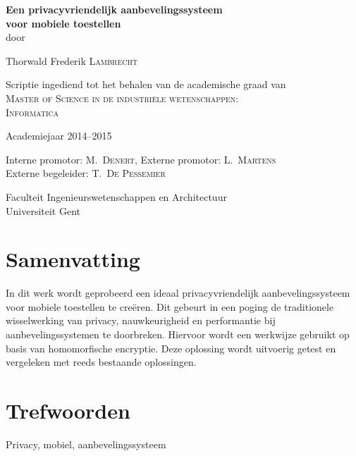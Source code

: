 
\newpage
{}
{
\setlength{\baselineskip}{12pt}
\setlength{\parindent}{0pt}
\setlength{\parskip}{6pt}

\begin{center}

\renewcommand{\baselinestretch}{1.1}
\noindent \huge \textbf{
Een privacyvriendelijk aanbevelingssysteem \\
voor mobiele toestellen 
} \\
\renewcommand{\baselinestretch}{1.3}
\normalsize
\vspace{3mm}
door 

Thorwald Frederik \textsc{Lambrecht}

Scriptie ingediend tot het behalen van de academische graad van\\
\textsc{Master of Science in de industri\"ele wetenschappen: \\Informatica}

Academiejaar 2014--2015

Interne promotor: M.~\textsc{Denert},
Externe promotor: L.~\textsc{Martens}\\
Externe begeleider: T.~\textsc{De Pessemier}

Faculteit Ingenieurswetenschappen en Architectuur\\
Universiteit Gent


\end{center}

\section*{Samenvatting}
In dit werk wordt geprobeerd een ideaal privacyvriendelijk aanbevelingssysteem voor mobiele toestellen te cre\"eren. Dit gebeurt in een poging de traditionele wisselwerking van privacy, nauwkeurigheid en performantie bij aanbevelingssystemen te doorbreken. Hiervoor wordt een werkwijze gebruikt op basis van homomorfische encryptie. Deze oplossing wordt uitvoerig getest en vergeleken met reeds bestaande oplossingen.

\section*{Trefwoorden}
Privacy, mobiel, aanbevelingssysteem
}

\newpage %
